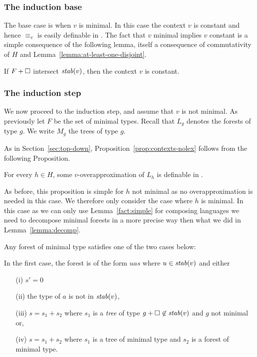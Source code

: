 \documentclass{LMCS}
\begin{document}
{\subsubsection{ The induction base}

The base case is when $v$ is minimal. In this case the context  $v$ is constant
and hence $\equiv_v$ is easily definable in \Stwo.  The fact that $v$ minimal
implies $v$ constant is a simple consequence of the following lemma, itself a
consequence of commutativity of $H$ and
Lemma~\ref{lemma:at-least-one-disjoint}.

\begin{lem}\label{lemma:at-least-one-disjoint-nolex}
  If $F+ \Box$ intersect $\mathit{stab}(v)$, then the context  $v$ is constant.  
\end{lem}

\subsubsection{The induction step}

We now proceed to the induction step, and assume that $v$ is not
minimal. As previously let $F$ be the set of minimal types. Recall that $L_g$
denotes the forests of type $g$. We write $M_g$ the trees of type $g$.

As in Section~\ref{sec:top-down}, Proposition~\ref{prop:contexts-nolex} follows
from the following Proposition.

\begin{prop}\label{prop:overapprox-nolex}
 For every $h \in H$, some $v$-overapproximation of $L_h$ is definable in \Stwo.
\end{prop}

As before, this proposition is simple for $h$ not minimal as no
overapproximation is needed in this case. We therefore only consider the case
where $h$ is minimal. In this case as we can only use Lemma~\ref{fact:simple}
for composing languages we need to decompose minimal forests in a more precise
way then what we did in Lemma~\ref{lemma:decomp}.

\begin{lem}\label{lemma:decomp-context-nolex}
Any forest of minimal type satisfies one of the two cases below:

\noindent
In the first case, the forest is of the form $uas$ where $u \in
\mathit{stab}(v)$ and either
\begin{enumerate}
 \item [(i)] $s'=0$
 \item [(ii)] the type of $a$ is not in $\mathit{stab}(v)$,
 \item [(iii)] $s=s_1+s_2$ where $s_1$ is a \emph{tree} of type $g+\Box \not\in \mathit{stab}(v)$ and $g$ not minimal or,
 \item [(iv)] $s=s_1+s_2$ where $s_1$ is a tree of minimal type and $s_2$ is a forest
   of minimal type.
\end{enumerate}


\end{lem}}
\end{document}
